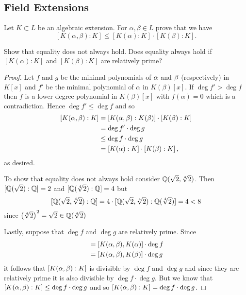 \subsection{Field Extensions}
    \begin{ex}{21.18}
        Let $K\subset L$ be an algebraic extension. For $\alpha, \beta\in L$ prove that we have
        $$ \left[K(\alpha,\beta):K\right]\leq\left[K(\alpha):K\right]\cdot\left[K(\beta):K\right].$$

        Show that equality does not always hold. Does equality always hold if $[K(\alpha):K]$ and $[K(\beta):K]$ are relatively prime?
    \end{ex}
    \begin{proof}
        Let $f$ and $g$ be the minimal polynomials of $\alpha$ and $\beta$ (respectively) in $K[x]$ and $f'$ be the minimal polynomial of $\alpha$ in $K(\beta)[x]$.
        If $\deg f'> \deg f$ then $f$ is a lower degree polynomial in $K(\beta)[x]$ with $f(\alpha)=0$ which is a contradiction. Hence $\deg f'\leq \deg f$ and so
        \begin{align*}
            \left[K(\alpha,\beta):K\right]&=\left[K(\alpha, \beta):K(\beta)\right]\cdot\left[K(\beta):K\right]\\
            &=\deg f'\cdot \deg g\\
            &\leq\deg f\cdot \deg g\\
            &=\left[K(\alpha):K\right]\cdot \left[K(\beta):K\right],   
        \end{align*}
        as desired.

        To show that equality does not always hold consider $\mathbb{Q}(\sqrt{2}, \sqrt[4]{2})$.
        Then $[\mathbb{Q}(\sqrt{2}):\mathbb{Q}]=2$ and $[\mathbb{Q}(\sqrt[4]{2}):\mathbb{Q}]=4$ but
        $$[\mathbb{Q}(\sqrt{2}, \sqrt[4]{2}):\mathbb{Q}]=4\cdot[\mathbb{Q}(\sqrt{2}, \sqrt[4]{2}):\mathbb{Q}(\sqrt[4]{2})]=4<8$$
        since $\left(\sqrt[4]{2}\right)^2=\sqrt{2}\in\mathbb{Q}(\sqrt[4]{2})$

        Lastly, suppose that $\deg f$ and $\deg g$ are relatively prime. Since
        \begin{align*}
            [K(\al,\be):K]&=[K(\al,\be), K(\al)]\cdot\deg f\\
            &=[K(\al,\be), K(\be)]\cdot\deg g
        \end{align*}
        it follows that $[K(\alpha,\beta):K]$ is divisible by $\deg f$ and $\deg g$ and since they are relatively prime it is also divisible by $\deg f\cdot \deg g$.
        But we know that $[K(\alpha,\beta):K]\leq\deg f\cdot\deg g$ and so $[K(\alpha,\beta):K]=\deg f\cdot \deg g$.
    \end{proof}

